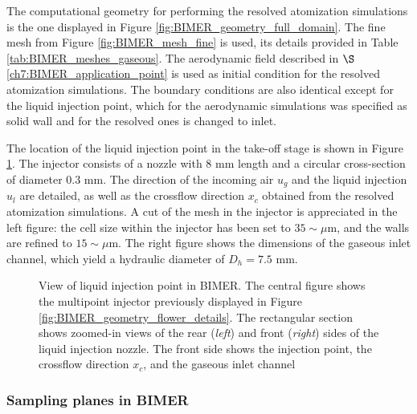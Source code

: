 The computational geometry for performing the resolved atomization simulations is the one displayed in Figure \ref{fig:BIMER_geometry_full_domain}. The fine mesh from Figure \ref{fig:BIMER_mesh_fine} is used, its details provided in Table \ref{tab:BIMER_meshes_gaseous}. The aerodynamic field described in $\S$\ref{ch7:BIMER_application_point} is used as initial condition for the resolved atomization simulations. The boundary conditions are also identical except for the liquid injection point, which for the aerodynamic simulations was specified as solid wall and for the resolved ones is changed to inlet. 

The location of the liquid injection point in the take-off stage is shown in Figure \ref{fig:BIMER_liquid_injector_views}. The injector consists of a nozzle with 8 mm length and a circular cross-section of diameter 0.3 mm. The direction of the incoming air $u_g$ and the liquid injection $u_l$ are detailed, as well as the crossflow direction $x_c$ obtained from the resolved atomization simulations. A cut of the mesh in the injector is appreciated in the left figure: the cell size within the injector has been set to $35 \sim \mu$m, and the walls are refined to $15 \sim \mu$m. The right figure shows the dimensions of the gaseous inlet channel, which yield a hydraulic diameter of $D_h = 7.5$ mm. 

\clearpage

\begin{figure}[h!]
	\centering	{}
	\caption[View of liquid injection point in BIMER]{View of liquid injection point in BIMER. The central figure shows the multipoint injector previously displayed in Figure \ref{fig:BIMER_geometry_flower_details}. The rectangular section shows zoomed-in views of the rear (\textsl{left}) and front (\textsl{right}) sides of the liquid injection nozzle. The front side shows the injection point, the crossflow direction $x_c$, and the gaseous inlet channel}%
	\label{fig:BIMER_liquid_injector_views}
\end{figure}

\vspace*{-0.2in}

\subsubsection*{Sampling planes in BIMER}

